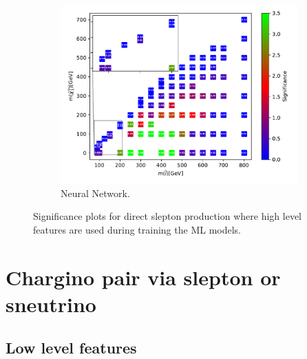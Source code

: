 \begin{figure}[H]
    \begin{subfigure}[t!]{0.49\textwidth}
    \includegraphics[width = \textwidth]{Figures/Significances/significance_NN_slepslep_High_level.pdf}
    \caption{Neural Network.}
        \label{fig:signHighSlepSlepNN}
    \end{subfigure}
    \caption{Significance plots for direct slepton production where high level features are used during training the ML models.}
    \label{fig:signHighSlepSlep}
\end{figure}















\section{Chargino pair via slepton or sneutrino}

\subsection{Low level features}

